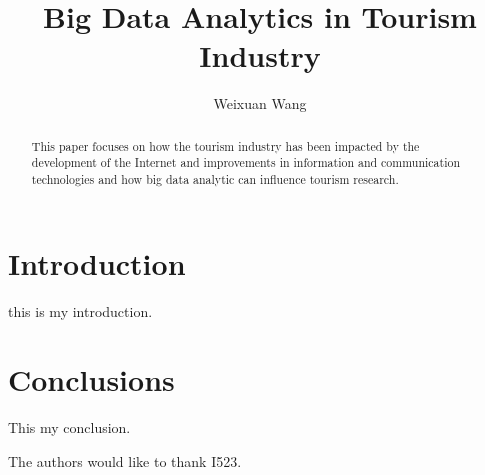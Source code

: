 \documentclass[sigconf]{acmart}
\begin{document}
\title{Big Data Analytics in Tourism Industry}


\author{Weixuan Wang}


\renewcommand{\shortauthors}{W. Wang}


\begin{abstract}
This paper focuses on how the tourism industry has been impacted by the
development of the Internet and improvements in information and communication
technologies and how big data analytic can influence tourism research.
\end{abstract}



\maketitle

\section{Introduction}

this is my introduction. 

\section{Conclusions}

This my conclusion.


\begin{acks}

  The authors would like to thank I523.

\end{acks}


 
\end{document}
